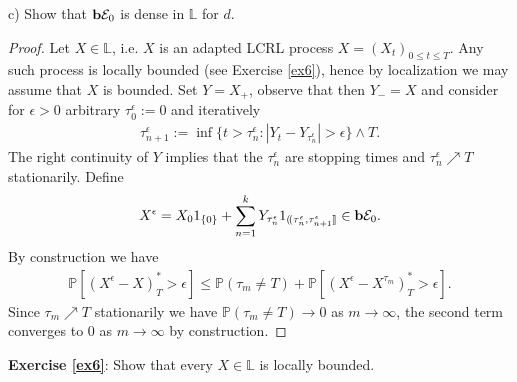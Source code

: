 \documentclass[12pt,a4paper, twoside]{article}
\theoremstyle{definition}
\newcommand{\PP}{\mathbb{P}} %
\newcommand{\simple}{\textbf{\text{b}}\mathcal{E}}
\begin{document}
\noindent c) Show that $\simple_0$ is dense in $\mathbb{L}$ for $d$. 
\begin{proof}
Let $X \in \mathbb{L}$, i.e. $X$ is an adapted LCRL process $X=(X_t)_{0 \leq t \leq T}$. Any such process is locally bounded (see Exercise \ref{ex6}), hence by localization we may assume that $X$ is bounded. Set $Y=X_+$, observe that then $Y_-=X$ and consider for $\epsilon>0$ arbitrary $\tau_0^\epsilon:=0$ and iteratively 
\begin{align*}
\tau_{n+1}^\epsilon:= \inf \{ t > \tau_n^\epsilon : |Y_t-Y_{\tau_n^\epsilon}| > \epsilon \} \wedge T.
\end{align*}
The right continuity of $Y$ implies that the $\tau_n^\epsilon$ are stopping times and $\tau_n^\epsilon \nearrow T$ stationarily. Define
\begin{align*}
X^\epsilon= X_0 1_{\{0\}} + \sum_{n=1}^k Y_{ \tau_n^\epsilon} 1_{(\!( \tau_n^\epsilon, \tau_{n+1}^\epsilon ]\!]} \in \simple_0.
\end{align*}
By construction we have 
\begin{align*}
\PP[(X^\epsilon-X)_T^* > \epsilon] \leq \PP( \tau_m \neq T) + \PP[(X^\epsilon-X^{\tau_m})_T^* > \epsilon].
\end{align*}
Since $\tau_m \nearrow T$ stationarily we have $\PP(\tau_m \neq T) \to 0 $ as $m \to \infty$, the second term converges to $0$ as $m \to \infty$ by construction. 
\end{proof}
\noindent \textbf{Exercise \ref{ex6}}: Show that every $X \in \mathbb{L}$ is locally bounded. 
\end{document}
